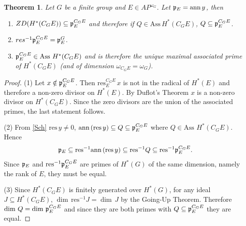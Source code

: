 \documentclass[reqno]{amsart}
\theoremstyle{plain}%
\newtheorem{thm}{Theorem}[section]
\theoremstyle{definition}
\theoremstyle{remark}
\newcommand\sub{\subseteq}
\newcommand\as{\text{Ass}\,}
\newcommand\an{\text{ann}\,}
\newcommand\fg{finitely generated }
\newcommand\res{\text{res}}
\begin{document}
\begin{thm} Let $G$ be a finite group and $E\in AP^{\omega_G}$. Let $\frak p_E=\an y$, then
\begin{enumerate} 
\item $ ZD(H^*(C_GE))\sub\frak p^{C_GE}_E$ and therefore if $Q\in \text{Ass}\,H^*(C_GE)$, $Q\sub \frak p^{C_GE}_E$.
\item $res^{-1}\frak p^{C_GE}_E=\frak p^G_E$.
\item $\frak p^{C_GE}_E\in\as\,H^*(C_GE)$ and is therefore the unique maximal associated prime of $H^*(C_GE)$ (and of dimension $\omega_{C_GE}=\omega_G$).
\end{enumerate}
\end{thm}

\begin{proof} (1) Let $x\notin\frak p^{C_GE}_E$. Then $\res^{C_GE}_E\,x$ is not in the radical of $H^*(E)$ and therefore a non-zero divisor on $H^*(E)$.  By Duflot's Theorem $x$ is a non-zero divisor on $H^*(C_GE)$. Since the zero divisors are the union of the associated primes, the last statement follows. 
\par (2) From \ref{Sch} $\res\,y\neq 0$, $\an(\res\,y)\sub Q\sub\frak p^{C_GE}_E$ where $Q\in\as\,H^*(C_GE)$.  Hence
$$ \frak p_E\sub\res^{-1}\an(\res\,y)\sub\res^{-1}Q\sub\res^{-1}\frak p^{C_GE}_E. $$
Since $\frak p_E$ and $\res^{-1}\frak p^{C_GE}_E$ are primes of $H^*(G)$ of the same dimension, namely the rank of $E$, they must be equal.
\par (3) Since $H^*(C_GE)$ is \fg over $H^*(G)$, for any ideal $J\sub H^*(C_GE)$, $\dim\,\res^{-1}J=\dim\,J$ by the Going-Up Theorem.  Therefore $\dim\,Q=\dim\,\frak p^{C_GE}_E$ and since they are both primes with $Q\sub\frak p^{C_GE}_E$ they are equal.
\end{proof}
\end{document}
